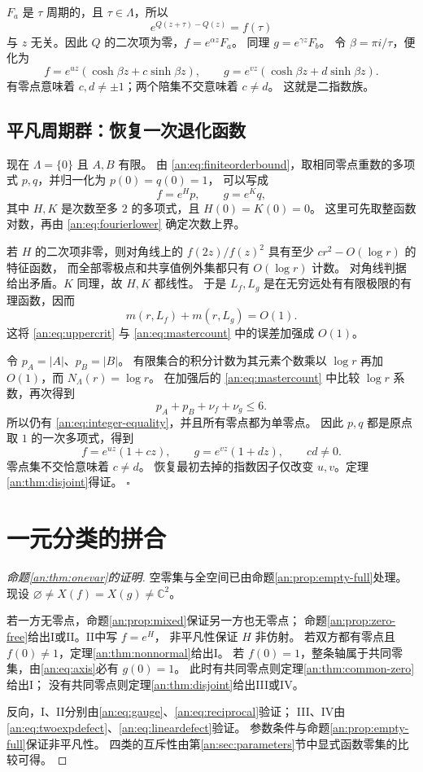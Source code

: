 \documentclass[11pt,a4paper,oneside,openany]{book}
\theoremstyle{lecture}
\newcommand{\C}{\mathbb C}
\numberwithin{equation}{section}
\begin{document}
$F_a$ 是 $\tau$ 周期的，且 $\tau\in\Lambda$，所以
\[
 e^{Q(z+\tau)-Q(z)}=f(\tau)
\]
与 $z$ 无关。因此 $Q$ 的二次项为零，$f=e^{\alpha z}F_a$。
同理 $g=e^{\gamma z}F_b$。
令 $\beta=\pi i/\tau$，便化为
\[
 f=e^{uz}(\cosh\beta z+c\sinh\beta z),\qquad
 g=e^{vz}(\cosh\beta z+d\sinh\beta z).
\]
有零点意味着 $c,d\ne\pm1$；两个陪集不交意味着 $c\ne d$。
这就是二指数族。

\subsection{平凡周期群：恢复一次退化函数}
现在 $\Lambda=\{0\}$ 且 $A,B$ 有限。
由 \eqref{an:eq:finiteorderbound}，取相同零点重数的多项式 $p,q$，并归一化为 $p(0)=q(0)=1$，
可以写成
\[
 f=e^Hp,\qquad g=e^Kq,
\]
其中 $H,K$ 是次数至多 $2$ 的多项式，且 $H(0)=K(0)=0$。
这里可先取整函数对数，再由 \eqref{an:eq:fourierlower} 确定次数上界。

若 $H$ 的二次项非零，则对角线上的 $f(2z)/f(z)^2$ 具有至少 $cr^2-O(\log r)$ 的特征函数，
而全部零极点和共享值例外集都只有 $O(\log r)$ 计数。
对角线判据给出矛盾。$K$ 同理，故 $H,K$ 都线性。
于是 $L_f,L_g$ 是在无穷远处有有限极限的有理函数，因而
\[
 m(r,L_f)+m(r,L_g)=O(1).
\]
这将 \eqref{an:eq:uppercrit} 与 \eqref{an:eq:mastercount} 中的误差加强成 $O(1)$。

令 $p_A=|A|$、$p_B=|B|$。
有限集合的积分计数为其元素个数乘以 $\log r$ 再加 $O(1)$，而 $N_\Lambda(r)=\log r$。
在加强后的 \eqref{an:eq:mastercount} 中比较 $\log r$ 系数，再次得到
\[
 p_A+p_B+\nu_f+\nu_g\le6.
\]
所以仍有 \eqref{an:eq:integer-equality}，并且所有零点都为单零点。
因此 $p,q$ 都是原点取 $1$ 的一次多项式，得到
\[
 f=e^{uz}(1+cz),\qquad g=e^{vz}(1+dz),\qquad cd\ne0.
\]
零点集不交恰意味着 $c\ne d$。
恢复最初去掉的指数因子仅改变 $u,v$。定理\ref{an:thm:disjoint}得证。
\hfill$\square$

\section{一元分类的拼合}\label{an:sec:finish}
\begin{proof}[命题\ref{an:thm:onevar}的证明]
空零集与全空间已由命题\ref{an:prop:empty-full}处理。
现设 $\varnothing\ne X(f)=X(g)\ne\C^2$。

若一方无零点，命题\ref{an:prop:mixed}保证另一方也无零点；
命题\ref{an:prop:zero-free}给出I或II。II中写 $f=e^H$，
非平凡性保证 $H$ 非仿射。
若双方都有零点且 $f(0)\ne1$，定理\ref{an:thm:nonnormal}给出I。
若 $f(0)=1$，整条轴属于共同零集，由\eqref{an:eq:axis}必有 $g(0)=1$。
此时有共同零点则定理\ref{an:thm:common-zero}给出I；
没有共同零点则定理\ref{an:thm:disjoint}给出III或IV。

反向，I、II分别由\eqref{an:eq:gauge}、\eqref{an:eq:reciprocal}验证；
III、IV由\eqref{an:eq:twoexpdefect}、\eqref{an:eq:lineardefect}验证。
参数条件与命题\ref{an:prop:empty-full}保证非平凡性。
四类的互斥性由第\ref{an:sec:parameters}节中显式函数零集的比较可得。
\end{proof}
\end{document}
